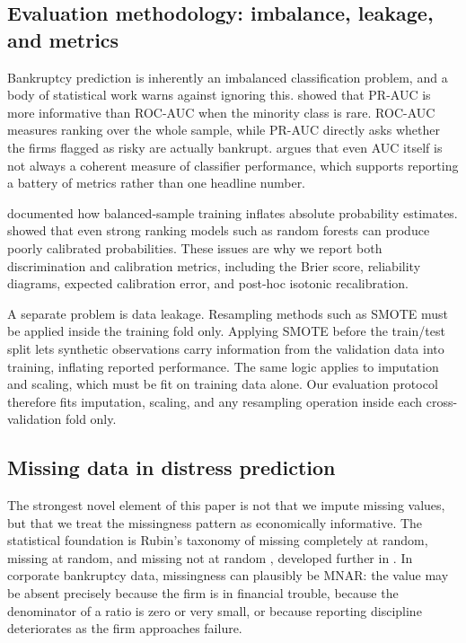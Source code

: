 \documentclass[12pt,a4paper]{article}
\begin{document}
\subsection{Evaluation methodology: imbalance, leakage, and metrics}

Bankruptcy prediction is inherently an imbalanced classification problem, and
a body of statistical work warns against ignoring this. \cite{saito2015}
showed that PR-AUC is more informative than ROC-AUC when the minority class is
rare. ROC-AUC measures ranking over the whole sample, while PR-AUC directly
asks whether the firms flagged as risky are actually bankrupt. \cite{hand2009}
argues that even AUC itself is not always a coherent measure of classifier
performance, which supports reporting a battery of metrics rather than one
headline number.

\cite{king2001} documented how balanced-sample training inflates absolute
probability estimates. \cite{niculescu2005} showed that even strong ranking
models such as random forests can produce poorly calibrated probabilities.
These issues are why we report both discrimination and calibration metrics,
including the Brier score, reliability diagrams, expected calibration error,
and post-hoc isotonic recalibration.

A separate problem is data leakage. Resampling methods such as SMOTE
\citep{chawla2002} must be applied inside the training fold only. Applying
SMOTE before the train/test split lets synthetic observations carry information
from the validation data into training, inflating reported performance. The
same logic applies to imputation and scaling, which must be fit on training
data alone. Our evaluation protocol therefore fits
imputation, scaling, and any resampling operation inside each cross-validation
fold only.

\subsection{Missing data in distress prediction}

The strongest novel element of this paper is not that we impute missing values,
but that we treat the missingness pattern as economically informative. The
statistical foundation is Rubin's taxonomy of missing completely at random,
missing at random, and missing not at random \citep{rubin1976}, developed
further in \cite{little2019}. In corporate bankruptcy data, missingness can
plausibly be MNAR: the value may be absent precisely because the firm is in
financial trouble, because the denominator of a ratio is zero or very small,
or because reporting discipline deteriorates as the firm approaches failure.
\end{document}
